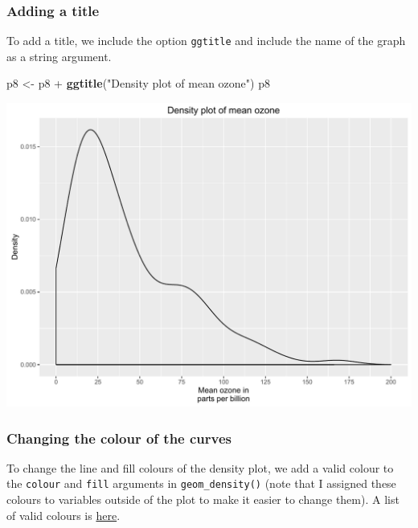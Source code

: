 \documentclass[]{article}
\newenvironment{Shaded}{\begin{snugshade}}{\end{snugshade}}
\newcommand{\KeywordTok}[1]{\textcolor[rgb]{0.13,0.29,0.53}{\textbf{{#1}}}}
\newcommand{\StringTok}[1]{\textcolor[rgb]{0.31,0.60,0.02}{{#1}}}
\newcommand{\NormalTok}[1]{{#1}}
\begin{document}
\subsubsection{Adding a title}\label{adding-a-title-1}

To add a title, we include the option \texttt{ggtitle} and include the
name of the graph as a string argument.

\begin{Shaded}
\begin{Highlighting}[]
\NormalTok{p8 <-}\StringTok{ }\NormalTok{p8 +}\StringTok{ }\KeywordTok{ggtitle}\NormalTok{(}\StringTok{"Density plot of mean ozone"}\NormalTok{)}
\NormalTok{p8}
\end{Highlighting}
\end{Shaded}

\begin{center}\includegraphics{0_all_posts_pdf/density_5-1} \end{center}

\subsubsection{Changing the colour of the
curves}\label{changing-the-colour-of-the-curves}

To change the line and fill colours of the density plot, we add a valid
colour to the \texttt{colour} and \texttt{fill} arguments in
\texttt{geom\_density()} (note that I assigned these colours to
variables outside of the plot to make it easier to change them). A list
of valid colours is
\href{http://www.stat.columbia.edu/~tzheng/files/Rcolor.pdf}{here}.
\end{document}
